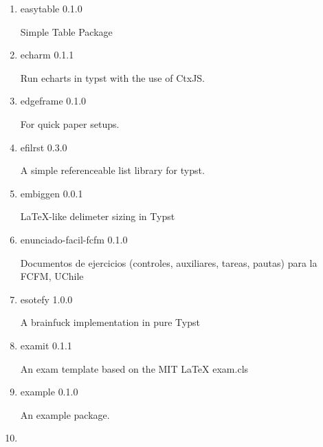 \begin{enumerate}
  { easy-pinyin } { 0.1.0 }

  Write Chinese pinyin easily.
\item
  \href{/universe/package/easytable/}{}

  { easytable } { 0.1.0 }

  Simple Table Package
\item
  \href{/universe/package/echarm/}{}

  { echarm } { 0.1.1 }

  Run echarts in typst with the use of CtxJS.
\item
  \href{/universe/package/edgeframe/}{}

  { edgeframe } { 0.1.0 }

  For quick paper setups.
\item
  \href{/universe/package/efilrst/}{}

  { efilrst } { 0.3.0 }

  A simple referenceable list library for typst.
\item
  \href{/universe/package/embiggen/}{}

  { embiggen } { 0.0.1 }

  LaTeX-like delimeter sizing in Typst
\item
  \href{/universe/package/enunciado-facil-fcfm/}{}


  { enunciado-facil-fcfm } { 0.1.0 }

  Documentos de ejercicios (controles, auxiliares, tareas, pautas) para
  la FCFM, UChile
\item
  \href{/universe/package/esotefy/}{}

  { esotefy } { 1.0.0 }

  A brainfuck implementation in pure Typst
\item
  \href{/universe/package/examit/}{}

  { examit } { 0.1.1 }

  An exam template based on the MIT LaTeX exam.cls
\item
  \href{/universe/package/example/}{}

  { example } { 0.1.0 }

  An example package.
\item
  \href{/universe/package/exzellenz-tum-thesis/}{}



\end{enumerate}
